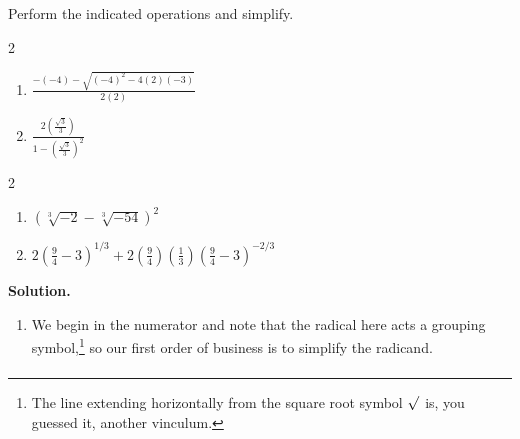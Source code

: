 \documentclass{ximera}
\begin{document}
\begin{example}  Perform the indicated operations and simplify. 

  
\begin{multicols}{2}

\begin{enumerate}

\item  $\frac{-(-4) - \sqrt{(-4)^2-4(2)(-3)}}{2(2)}$

\item  $\frac{2 \left( \frac{\sqrt{3}}{3}\right)}{1 - \left( \frac{\sqrt{3}}{3} \right)^2}$

\setcounter{HW}{\value{enumi}}

\end{enumerate}

\end{multicols}

\begin{multicols}{2}

\begin{enumerate}

\setcounter{enumi}{\value{HW}}

\item  $(\sqrt[3]{-2} - \sqrt[3]{-54})^2$

\item  $2 \left(\frac{9}{4} - 3\right)^{1/3} + 2\left(\frac{9}{4}\right)\left(\frac{1}{3}\right)\left(\frac{9}{4}-3\right)^{-2/3}$

\end{enumerate}

\end{multicols}

\pagebreak

{\bf Solution.}  

\begin{enumerate}

\item  We begin in the numerator and note that the radical here acts a grouping symbol,\footnote{The line extending horizontally from the square root symbol $\sqrt{\vphantom{2}}$ is, you guessed it, another vinculum.} so our first order of business is to simplify the radicand.\[ \begin{array}{rclr}


\end{array}\]
\end{enumerate}
\end{example}
\end{document}
